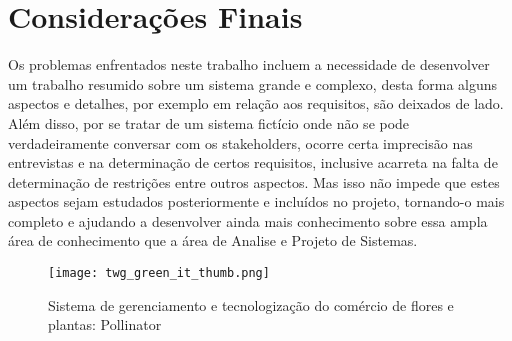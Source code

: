  

\chapter{Considera\c{c}\~{o}es Finais}


Os problemas enfrentados neste trabalho incluem a necessidade de desenvolver um trabalho resumido sobre um sistema grande e complexo, desta forma alguns aspectos e detalhes, por exemplo em relação aos requisitos, são deixados de lado. Além disso, por se tratar de um sistema fictício onde não se pode verdadeiramente conversar com os stakeholders, ocorre certa imprecisão nas entrevistas e na determinação de certos requisitos, inclusive acarreta na falta de determinação de restrições entre outros aspectos. Mas isso não impede que estes aspectos sejam estudados posteriormente e incluídos no projeto, tornando-o mais completo e ajudando a desenvolver ainda mais conhecimento sobre essa ampla área de conhecimento que a área de Analise e Projeto de Sistemas.

   \begin{figure}[H]
    \begin{center}
        \texttt{[image: twg\_green\_it\_thumb.png]}
        \caption{Sistema de gerenciamento e tecnologização do comércio de flores e plantas: Pollinator} \label{sistema}
    \end{center}
   \end{figure} 